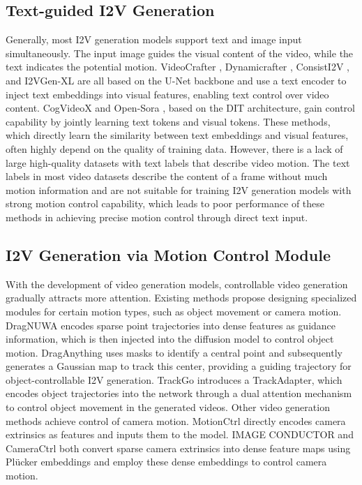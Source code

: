 \subsection{Text-guided I2V Generation}
Generally, most I2V generation models \cite{dai2023animateanything,zhang2024moonshot,ma2024cinemo,jin2024pyramidal} support text and image input simultaneously. The input image guides the visual content of the video, while the text indicates the potential motion. VideoCrafter \cite{chen2023videocrafter1}, Dynamicrafter \cite{xing2025dynamicrafter}, ConsistI2V \cite{ren2024consisti2v}, and I2VGen-XL \cite{zhang2023i2vgen} are all based on the U-Net \cite{ronneberger2015u} backbone and use a text encoder to inject text embeddings into visual features, enabling text control over video content. CogVideoX \cite{yang2024cogvideox} and Open-Sora \cite{OpenSora}, based on the DIT \cite{peebles2023scalable} architecture, gain control capability by jointly learning text tokens and visual tokens. These methods, which directly learn the similarity between text embeddings and visual features, often highly depend on the quality of training data. However, there is a lack of large high-quality datasets with text labels that describe video motion. The text labels in most video datasets \cite{bain2021frozen,xue2022advancing,wang2023internvid,chen2024panda,tan2024vidgen} describe the content of a frame without much motion information and are not suitable for training I2V generation models with strong motion control capability, which leads to poor performance of these methods in achieving precise motion control through direct text input.

\subsection{I2V Generation via Motion Control Module}
With the development of video generation models, controllable video generation gradually attracts more attention. Existing methods \cite{zhang2024tora,xu2024cavia,xu2024camco} propose designing specialized modules for certain motion types, such as object movement or camera motion. DragNUWA \cite{yin2023dragnuwa} encodes sparse point trajectories into dense features as guidance information, which is then injected into the diffusion model to control object motion. DragAnything \cite{wu2025draganything} uses masks to identify a central point and subsequently generates a Gaussian map to track this center, providing a guiding trajectory for object-controllable I2V generation. TrackGo \cite{zhou2024trackgo} introduces a TrackAdapter, which encodes object trajectories into the network through a dual attention mechanism to control object movement in the generated videos. Other video generation methods achieve control of camera motion. MotionCtrl \cite{wang2024motionctrl} directly encodes camera extrinsics as features and inputs them to the model. IMAGE CONDUCTOR \cite{li2024image} and CameraCtrl \cite{he2024cameractrl} both convert sparse camera extrinsics into dense feature maps using Plücker embeddings and employ these dense embeddings to control camera motion.

